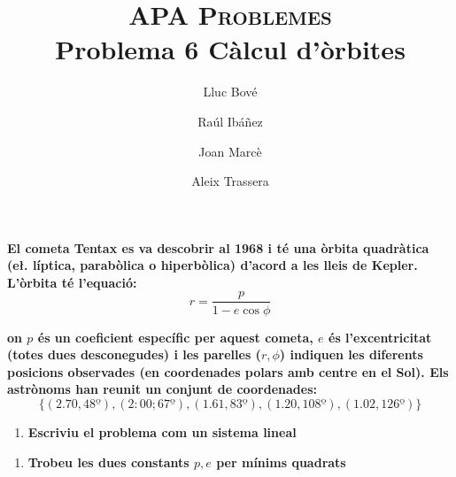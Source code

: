 \documentclass[a4paper]{article}
\title{\textsc{APA Problemes} \\ Problema 6 Càlcul d'òrbites}
\author{Lluc Bové \and Raúl Ibáñez \and Joan Marcè \and Aleix Trassera}
\date{}
\begin{document}
\maketitle

\textbf{El cometa Tentax es va descobrir al 1968 i té una òrbita quadràtica (e\l. líptica, parabòlica o hiperbòlica) d'acord a les lleis de Kepler. L'òrbita té l'equació:}
$$
r = \frac{p}{1 - e \cos \phi}
$$

\textbf{on $p$ és un coeficient específic per aquest cometa, $e$ és l'excentricitat (totes dues desconegudes) i les parelles ($r,\phi$) indiquen les diferents posicions observades (en coordenades polars amb centre en el Sol). Els astrònoms han reunit un conjunt de coordenades:}
$$
\{(2.70, 48º), (2:00; 67º), (1.61, 83º), (1.20, 108º), (1.02, 126º)\}
$$

\begin{enumerate}
	\item \textbf{Escriviu el problema com un sistema lineal}
\end{enumerate}

\begin{enumerate}[resume]
	\item \textbf{Trobeu les dues constants $p,e$ per mínims quadrats}
\end{enumerate}
\end{document}
